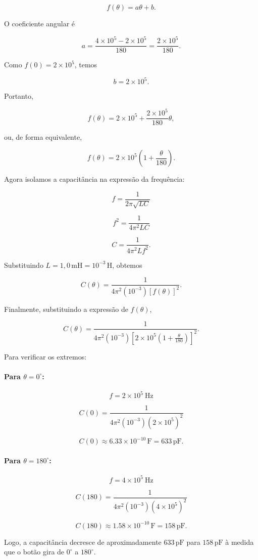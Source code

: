 \documentclass[12pt,a4paper]{article}
\begin{document}
\[
f(\theta)=a\theta+b.
\]

O coeficiente angular é

\[
a=\frac{4\times10^5-2\times10^5}{180}
=\frac{2\times10^5}{180}.
\]

Como \(f(0)=2\times10^5\), temos

\[
b=2\times10^5.
\]

Portanto,

\[
f(\theta)=2\times10^5+\frac{2\times10^5}{180}\theta,
\]

ou, de forma equivalente,

\[
f(\theta)=2\times10^5\left(1+\frac{\theta}{180}\right).
\]

Agora isolamos a capacitância na expressão da frequência:

\[
f=\frac{1}{2\pi\sqrt{LC}}
\]

\[
f^2=\frac{1}{4\pi^2LC}
\]

\[
C=\frac{1}{4\pi^2Lf^2}.
\]

Substituindo \(L=1,0\,\text{mH}=10^{-3}\,\text{H}\), obtemos

\[
C(\theta)=
\frac{1}
{4\pi^2(10^{-3})[f(\theta)]^2}.
\]

Finalmente, substituindo a expressão de \(f(\theta)\),

\[
\boxed{
C(\theta)=
\frac{1}
{4\pi^2(10^{-3})
\left[
2\times10^5
\left(1+\frac{\theta}{180}\right)
\right]^2}
}.
\]

Para verificar os extremos:

\paragraph{Para \(\theta=0^\circ\):}

\[
f=2\times10^5\ \text{Hz}
\]

\[
C(0)=
\frac{1}
{4\pi^2(10^{-3})(2\times10^5)^2}
\]

\[
C(0)\approx6.33\times10^{-10}\,\text{F}
=633\,\text{pF}.
\]

\paragraph{Para \(\theta=180^\circ\):}

\[
f=4\times10^5\ \text{Hz}
\]

\[
C(180)=
\frac{1}
{4\pi^2(10^{-3})(4\times10^5)^2}
\]

\[
C(180)\approx1.58\times10^{-10}\,\text{F}
=158\,\text{pF}.
\]

Logo, a capacitância decresce de aproximadamente \(633\,\text{pF}\) para \(158\,\text{pF}\) à medida que o botão gira de \(0^\circ\) a \(180^\circ\).
\end{document}
